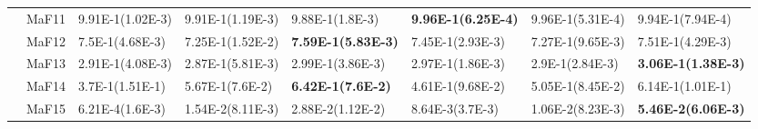 \documentclass[]{article}
\begin{document}
\begin{landscape}
\begin{table}
\begin{footnotesize}
\begin{tabular}{|l|l|l|l|l|l|l|l|}
 & MaF11 & 9.91E-1(1.02E-3) & 9.91E-1(1.19E-3) & 9.88E-1(1.8E-3) & \cellcolor{gray95} {\bf 9.96E-1(6.25E-4)} & \cellcolor{gray95} 9.96E-1(5.31E-4) & 9.94E-1(7.94E-4)\\
 & MaF12 & \cellcolor{gray95} 7.5E-1(4.68E-3) & 7.25E-1(1.52E-2) & \cellcolor{gray95} {\bf 7.59E-1(5.83E-3)} & 7.45E-1(2.93E-3) & 7.27E-1(9.65E-3) & \cellcolor{gray95} 7.51E-1(4.29E-3)\\
 & MaF13 & 2.91E-1(4.08E-3) & 2.87E-1(5.81E-3) & \cellcolor{gray95} 2.99E-1(3.86E-3) & 2.97E-1(1.86E-3) & 2.9E-1(2.84E-3) & \cellcolor{gray95} {\bf 3.06E-1(1.38E-3)}\\
 & MaF14 & 3.7E-1(1.51E-1) & \cellcolor{gray95} 5.67E-1(7.6E-2) & \cellcolor{gray95} {\bf 6.42E-1(7.6E-2)} & 4.61E-1(9.68E-2) & 5.05E-1(8.45E-2) & \cellcolor{gray95} 6.14E-1(1.01E-1)\\
 & MaF15 & 6.21E-4(1.6E-3) & 1.54E-2(8.11E-3) & \cellcolor{gray95} 2.88E-2(1.12E-2) & 8.64E-3(3.7E-3) & 1.06E-2(8.23E-3) & \cellcolor{gray95} {\bf 5.46E-2(6.06E-3)}\\
\hline


\end{tabular}
\end{footnotesize}
\end{table}
\end{landscape}
\end{document}

